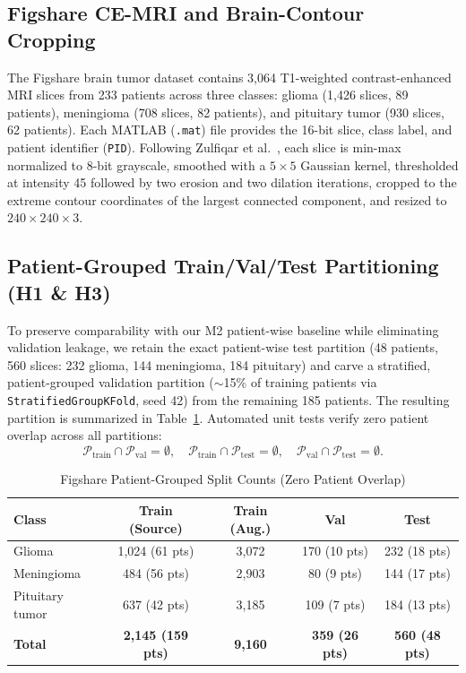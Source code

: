 \documentclass[conference]{IEEEtran}
\begin{document}
\subsection{Figshare CE-MRI and Brain-Contour Cropping}
The Figshare brain tumor dataset \cite{cheng2015enhanced} contains 3,064 T1-weighted contrast-enhanced MRI slices from 233 patients across three classes: glioma (1,426 slices, 89 patients), meningioma (708 slices, 82 patients), and pituitary tumor (930 slices, 62 patients). Each MATLAB (\texttt{.mat}) file provides the 16-bit slice, class label, and patient identifier (\texttt{PID}). Following Zulfiqar et al.\ \cite{zulfiqar2023efficientnet}, each slice is min-max normalized to 8-bit grayscale, smoothed with a $5\times5$ Gaussian kernel, thresholded at intensity 45 followed by two erosion and two dilation iterations, cropped to the extreme contour coordinates of the largest connected component, and resized to $240\times240\times3$.

\subsection{Patient-Grouped Train/Val/Test Partitioning (H1 \& H3)}
To preserve comparability with our M2 patient-wise baseline while eliminating validation leakage, we retain the exact patient-wise test partition (48 patients, 560 slices: 232 glioma, 144 meningioma, 184 pituitary) and carve a stratified, patient-grouped validation partition ($\sim$15\% of training patients via \texttt{StratifiedGroupKFold}, seed 42) from the remaining 185 patients. The resulting partition is summarized in Table~\ref{tab:splits}. Automated unit tests verify zero patient overlap across all partitions:
\begin{equation}
\mathcal{P}_{\text{train}} \cap \mathcal{P}_{\text{val}} = \emptyset,\quad
\mathcal{P}_{\text{train}} \cap \mathcal{P}_{\text{test}} = \emptyset,\quad
\mathcal{P}_{\text{val}} \cap \mathcal{P}_{\text{test}} = \emptyset.
\end{equation}

\begin{table}[htbp]
\caption{Figshare Patient-Grouped Split Counts (Zero Patient Overlap)}
\label{tab:splits}
\centering
\begin{tabular}{lcccc}
\toprule
\textbf{Class} & \textbf{Train (Source)} & \textbf{Train (Aug.)} & \textbf{Val} & \textbf{Test} \\
\midrule
Glioma          & 1,024 (61 pts) & 3,072 & 170 (10 pts) & 232 (18 pts) \\
Meningioma      &   484 (56 pts) & 2,903 &  80 (9 pts)  & 144 (17 pts) \\
Pituitary tumor &   637 (42 pts) & 3,185 & 109 (7 pts)  & 184 (13 pts) \\
\midrule
\textbf{Total}  & \textbf{2,145 (159 pts)} & \textbf{9,160} & \textbf{359 (26 pts)} & \textbf{560 (48 pts)} \\
\bottomrule
\end{tabular}
\end{table}
\end{document}
